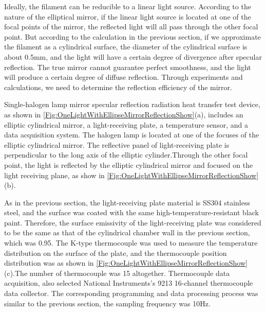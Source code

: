 Ideally, the filament can be reducible to a linear light source. According to the nature of the elliptical mirror, if the linear light source is located at one of the focal points of the mirror, the reflected light will all pass through the other focal point.
But according to the calculation in the previous section, if we approximate the filament as a cylindrical surface, the diameter of the cylindrical surface is about 0.5mm, and the light will have a certain degree of divergence after specular reflection.
The true mirror cannot guarantee perfect smoothness, and the light will produce a certain degree of diffuse reflection. Through experiments and calculations, we need to determine the reflection efficiency of the mirror.


Single-halogen lamp mirror specular reflection radiation heat transfer test device, as shown in \ref{Fig:OneLightWithEllipseMirrorReflectionShow}(a), includes an elliptic cylindrical mirror, a light-receiving plate, a temperature sensor, and a data acquisition system.
The halogen lamp is located at one of the focuses of the elliptic cylindrical mirror. The reflective panel of light-receiving plate is perpendicular to the long axis of the elliptic cylinder.Through the other focal point, the light is reflected by the elliptic cylindrical mirror and focused on the light receiving plane, as show in \ref{Fig:OneLightWithEllipseMirrorReflectionShow}(b).


As in the previous section, the light-receiving plate material is SS304 stainless steel, and the surface was coated with the same high-temperature-resistant black paint. Therefore, the surface emissivity of the light-receiving plate was considered to be the same as that of the cylindrical chamber wall in the previous section, which was 0.95.
The K-type thermocouple was used to measure the temperature distribution on the surface of the plate, and the thermocouple position distribution was as shown in \ref{Fig:OneLightWithEllipseMirrorReflectionShow}(c).The number of thermocouple was 15 altogether.
Thermocouple data acquisition, also selected National Instruments's 9213 16-channel thermocouple data collector. The corresponding programming and data processing process was similar to the previous section, the sampling frequency was 10Hz.

